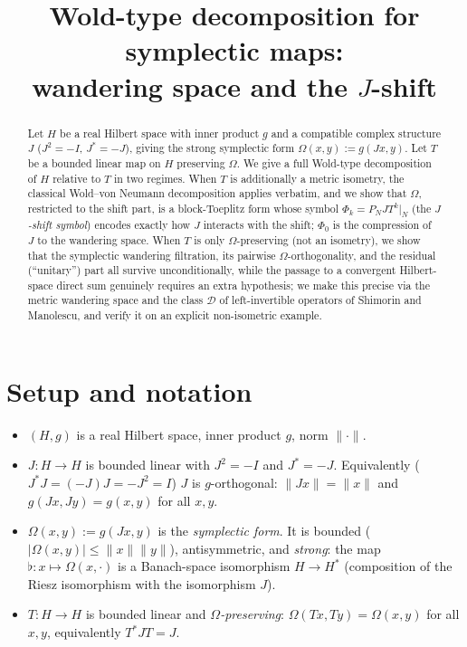 \documentclass[11pt,a4paper]{article}
\title{Wold-type decomposition for symplectic maps:\\ wandering space and the $J$-shift}
\author{}
\date{}
\theoremstyle{definition}
\theoremstyle{remark}
\newcommand{\cJ}{J}
\newcommand{\Om}{\Omega}
\begin{document}
\maketitle

\begin{abstract}
Let $H$ be a real Hilbert space with inner product $g$ and a compatible complex structure
$\cJ$ ($\cJ^2=-I$, $\cJ^*=-\cJ$), giving the strong symplectic form $\Omega(x,y):=g(\cJ x,y)$.
Let $T$ be a bounded linear map on $H$ preserving $\Omega$. We give a full Wold-type
decomposition of $H$ relative to $T$ in two regimes. When $T$ is additionally a metric
isometry, the classical Wold--von Neumann decomposition applies verbatim, and we show that
$\Omega$, restricted to the shift part, is a block-Toeplitz form whose symbol
$\Phi_k=P_NJT^k|_N$ (the \emph{$J$-shift symbol}) encodes exactly how $J$ interacts with
the shift; $\Phi_0$ is the compression of $J$ to the wandering space. When $T$ is only
$\Omega$-preserving (not an isometry), we show that the symplectic wandering filtration,
its pairwise $\Omega$-orthogonality, and the residual (``unitary'') part all survive
unconditionally, while the passage to a convergent Hilbert-space direct sum genuinely
requires an extra hypothesis; we make this precise via the metric wandering space and the
class $\mathcal D$ of left-invertible operators of Shimorin and Manolescu, and verify it on
an explicit non-isometric example.
\end{abstract}

\tableofcontents

\section{Setup and notation}
\label{sec:setup}

\begin{itemize}
\item $(H,g)$ is a real Hilbert space, inner product $g$, norm $\|\cdot\|$.
\item $\cJ:H\to H$ is bounded linear with $\cJ^2=-I$ and $\cJ^*=-\cJ$. Equivalently
($\cJ^*\cJ=(-\cJ)\cJ=-\cJ^2=I$) $\cJ$ is $g$-orthogonal: $\|\cJ x\|=\|x\|$ and
$g(\cJ x,\cJ y)=g(x,y)$ for all $x,y$.
\item $\Om(x,y):=g(\cJ x,y)$ is the \emph{symplectic form}. It is bounded
($|\Om(x,y)|\le\|x\|\|y\|$), antisymmetric, and \emph{strong}: the map
$\flat:x\mapsto\Om(x,\cdot)$ is a Banach-space isomorphism $H\to H^{*}$ (composition of the
Riesz isomorphism with the isomorphism $\cJ$).
\item $T:H\to H$ is bounded linear and \emph{$\Om$-preserving}:
$\Om(Tx,Ty)=\Om(x,y)$ for all $x,y$, equivalently $T^{*}\cJ T=\cJ$.
\end{itemize}
\end{document}
